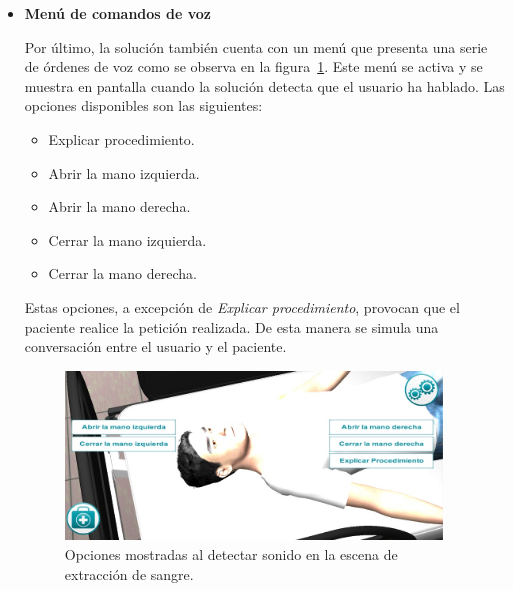 \begin{itemize}
\item \textbf{Menú de comandos de voz}

Por último, la solución también cuenta con un menú que presenta una serie de órdenes 
de voz como se observa en la figura~\ref{fig:hemocultivo_voz_gui}. Este menú se 
	activa y se muestra en pantalla cuando la solución detecta que el usuario ha 
	hablado. Las opciones disponibles son las siguientes:
	
	\begin{itemize}
	\item Explicar procedimiento.
	\item Abrir la mano izquierda.
	\item Abrir la mano derecha.
	\item Cerrar la mano izquierda.
	\item Cerrar la mano derecha.
	\end{itemize}
	
	Estas opciones, a excepción de \emph{Explicar procedimiento}, provocan que el 
	paciente realice la petición realizada. De esta manera se simula una conversación 
	entre el usuario y el paciente.
	
	\begin{figure}[H]
	\centering
	\includegraphics[width=10cm]{solucion/images/hemocultivo_comando_voz.jpg}
	\caption{Opciones mostradas al detectar sonido en la escena de extracción
    de sangre.}
	\label{fig:hemocultivo_voz_gui}
	\end{figure}

\end{itemize}









